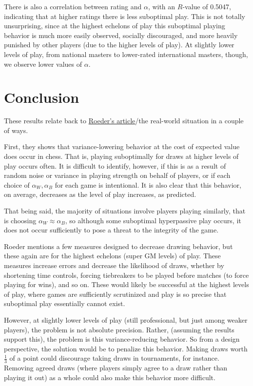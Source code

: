 \documentclass{article}
\begin{document}
There is also a correlation between rating and $\alpha$, with an $R$-value of 0.5047, indicating that at higher ratings
there is less suboptimal play.
This is not totally unsurprising, since at the highest echelons of play this suboptimal playing behavior is much more easily
observed, socially discouraged, and more heavily punished by other players (due to the higher levels of play).
At slightly lower levels of play, from national masters to lower-rated international masters, though, we observe lower
values of $\alpha$.

\section{Conclusion}
These results relate back to \href{https://fivethirtyeight.com/features/some-humble-suggestions-to-save-chess-from-itself/}{Roeder's article}/the real-world situation in a couple of ways.

First, they shows that variance-lowering behavior at the cost of expected value does occur in chess.
That is, playing suboptimally for draws at higher levels of play occurs often.
It is difficult to identify, however, if this is as a result of random noise or variance in playing strength
on behalf of players, or if each choice of $\alpha_W, \alpha_B$ for each game is intentional.
It is also clear that this behavior, on average, decreases as the level of play increases, as predicted.

That being said, the majority of situations involve players playing similarly, that is choosing
$\alpha_W\approx \alpha_B$, so although some suboptimal hyperpassive play occurs, it does not occur
sufficiently to pose a threat to the integrity of the game.

Roeder mentions a few measures designed to decrease drawing behavior, but these again are for
the highest echelons (super GM levels) of play.
These measures increase errors and decrease the likelihood of draws, whether by shortening time
controls, forcing tiebreakers to be played before matches (to force playing for wins), and so on.
These would likely be successful at the highest levels of play, where games are sufficiently
scrutinized and play is so precise that suboptimal play essentially cannot exist.

However, at slightly lower levels of play (still professional, but just among weaker players), the problem is not absolute precision.
Rather, (assuming the results support this), the problem is this variance-reducing behavior.
So from a design perspective, the solution would be to penalize this behavior.
Making draws worth $\frac{1}{3}$ of a point could discourage taking draws in tournaments, for instance.
Removing agreed draws (where players simply agree to a draw rather than playing it out) as a whole could also make this behavior more difficult.
\end{document}
